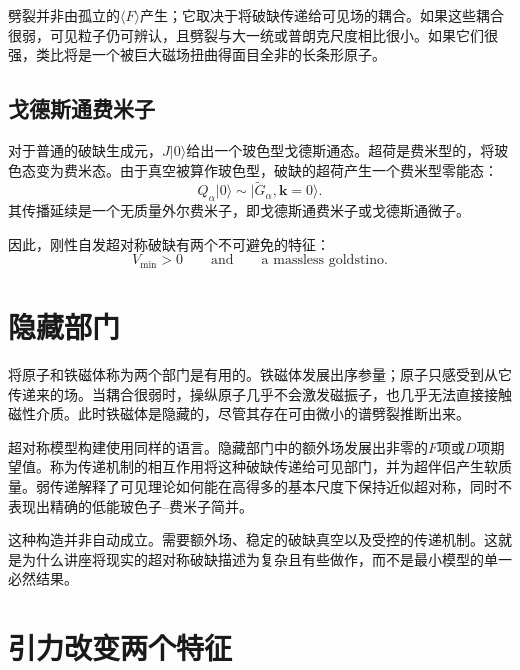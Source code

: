 劈裂并非由孤立的\(\langle F\rangle\)产生；它取决于将破缺传递给可见场的耦合。如果这些耦合很弱，可见粒子仍可辨认，且劈裂与大一统或普朗克尺度相比很小。如果它们很强，类比将是一个被巨大磁场扭曲得面目全非的长条形原子。

\subsection{戈德斯通费米子}

对于普通的破缺生成元，\(J|0\rangle\)给出一个玻色型戈德斯通态。超荷是费米型的，将玻色态变为费米态。由于真空被算作玻色型，破缺的超荷产生一个费米型零能态：
\begin{equation}
Q_\alpha|0\rangle
\sim
|\widetilde G_\alpha,\mathbf k=0\rangle.
\label{eq:l9-goldstino}
\end{equation}
其传播延续是一个无质量外尔费米子，即戈德斯通费米子或戈德斯通微子。

\begin{classroomqa}
\end{classroomqa}

因此，刚性自发超对称破缺有两个不可避免的特征：
\begin{equation}
\boxed{
V_{\min}>0
\qquad\text{and}\qquad
\text{a massless goldstino}.
}
\label{eq:l9-rigid-breaking-signatures}
\end{equation}

\section{隐藏部门}

将原子和铁磁体称为两个部门是有用的。铁磁体发展出序参量；原子只感受到从它传递来的场。当耦合很弱时，操纵原子几乎不会激发磁振子，也几乎无法直接接触磁性介质。此时铁磁体是隐藏的，尽管其存在可由微小的谱劈裂推断出来。

超对称模型构建使用同样的语言。隐藏部门中的额外场发展出非零的\(F\)项或\(D\)项期望值。称为传递机制的相互作用将这种破缺传递给可见部门，并为超伴侣产生软质量。弱传递解释了可见理论如何能在高得多的基本尺度下保持近似超对称，同时不表现出精确的低能玻色子--费米子简并。

这种构造并非自动成立。需要额外场、稳定的破缺真空以及受控的传递机制。这就是为什么讲座将现实的超对称破缺描述为复杂且有些做作，而不是最小模型的单一必然结果。

\section{引力改变两个特征}

